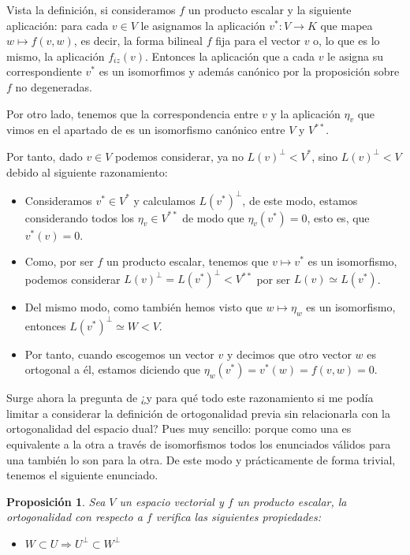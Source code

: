 \documentclass[10pt,a4paper,openright]{book}
\theoremstyle{break}
\newtheorem*{prop}{Proposición}
\begin{document}
Vista la definición, si consideramos $f$ un producto escalar y la siguiente aplicación:
para cada $v\in V$ le asignamos la aplicación $v^*: V \rightarrow K$ que mapea $w\mapsto f(v,w)$, es decir, la forma bilineal $f$ fija para el vector $v$ o, lo que es lo mismo, la aplicación $f_{iz}(v)$. Entonces la aplicación que a cada $v$ le asigna su correspondiente $v^*$ es un isomorfimos y además canónico por la proposición sobre $f$ no degeneradas.

Por otro lado, tenemos que la correspondencia entre $v$ y la aplicación $\eta_v$ que vimos en el apartado de  es un isomorfismo canónico entre $V$ y $V^{**}$.

Por tanto, dado $v\in V$ podemos considerar, ya no $L(v)^\perp < V^*$, sino $L(v)^\perp < V$ debido al siguiente razonamiento:
\begin{itemize}
\item Consideramos $v^*\in V^*$ y calculamos $L(v^*)^\perp$, de este modo, estamos considerando todos los $\eta_v\in V^{**}$ de modo que $\eta_v(v^*) = 0$, esto es, que $v^*(v) = 0$.
\item Como, por ser $f$ un producto escalar, tenemos que $v\mapsto v^*$ es un isomorfismo, podemos considerar $L(v)^\perp = L(v^*)^\perp < V^{**}$ por ser $L(v)\simeq L(v^*)$.
\item Del mismo modo, como también hemos visto que $w\mapsto \eta_w$ es un isomorfismo, entonces $L(v^*)^\perp \simeq W < V$.
\item Por tanto, cuando escogemos un vector $v$ y decimos que otro vector $w$ es ortogonal a él, estamos diciendo que $\eta_w(v^*) = v^*(w)= f(v,w) = 0 $.
\end{itemize}
Surge ahora la pregunta de ¿y para qué todo este razonamiento si me podía limitar a considerar la definición de ortogonalidad previa sin relacionarla con la ortogonalidad del espacio dual? Pues muy sencillo: porque como una es equivalente a la otra a través de isomorfismos todos los enunciados válidos para una también lo son para la otra. De este modo y prácticamente de forma trivial, tenemos el siguiente enunciado.

\begin{prop}
Sea $V$ un espacio vectorial y $f$ un producto escalar, la ortogonalidad con respecto a $f$ verifica las siguientes propiedades:
\begin{itemize}
\item $W\subset U \Rightarrow U^\perp \subset W^\perp$
\end{itemize}
\end{prop}
\end{document}
